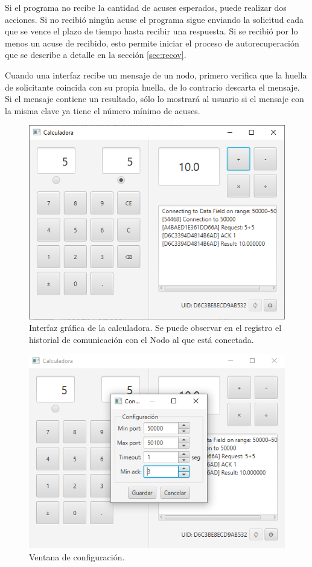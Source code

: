 \documentclass[conference,compsoc]{IEEEtran}
\begin{document}
Si el programa no recibe la cantidad de acuses esperados, puede realizar dos acciones. Si no recibió ningún acuse el programa sigue enviando la solicitud cada que se vence el plazo de tiempo hasta recibir una respuesta. Si se recibió por lo menos un acuse de recibido, esto permite iniciar el proceso de autorecuperación que se describe a detalle en la sección \ref{sec:recov}.

Cuando una interfaz recibe un mensaje de un nodo, primero verifica que la huella de solicitante coincida con su propia huella, de lo contrario descarta el mensaje.
Si el mensaje contiene un resultado, sólo lo mostrará al usuario si el mensaje con la misma clave ya tiene el número mínimo de acuses.

\begin{figure}[htb]
    \centering
    \includegraphics[width=0.9\columnwidth]{demo.png}
    \caption{Interfaz gráfica de la calculadora. Se puede observar en el registro el historial de comunicación con el Nodo al que está conectada.}
    \label{fig:demo}
\end{figure}

\begin{figure}[htb]
    \centering
    \includegraphics[width=0.9\columnwidth]{config.png}
    \caption{Ventana de configuración.}
    \label{fig:config}
\end{figure}
\end{document}
